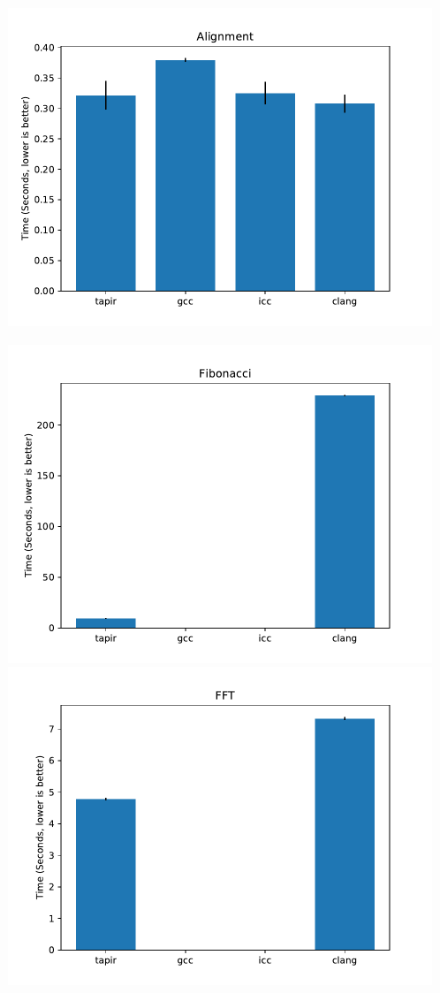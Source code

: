 \documentclass[sigconf]{acmart}
\begin{document}
\begin{figure}
\begin{multicols}{2}
  \includegraphics[width=\linewidth]{alignment.pdf} \par
  \includegraphics[width=\linewidth]{fib.pdf} 
  \includegraphics[width=\linewidth]{fft.pdf} \par

\end{multicols}
\end{figure}
\end{document}

